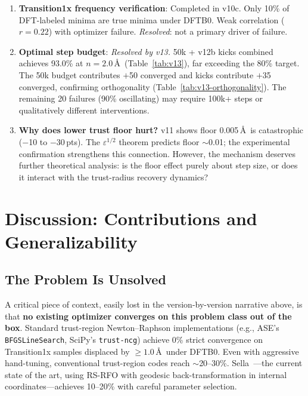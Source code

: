 \documentclass[11pt,a4paper]{article}
\theoremstyle{definition}
\begin{document}
\begin{enumerate}
  \item \textbf{Transition1x frequency verification}: Completed in v10c.
    Only 10\% of DFT-labeled minima are true minima under DFTB0.
    Weak correlation ($r=0.22$) with optimizer failure.
    \emph{Resolved}: not a primary driver of failure.

  \item \textbf{Optimal step budget}: \emph{Resolved by v13.}
    50k + v12b kicks combined achieves 93.0\% at $n=2.0$\,\AA\
    (Table~\ref{tab:v13}), far exceeding the 80\% target.  The
    50k budget contributes $+$50 converged and kicks contribute
    $+$35 converged, confirming orthogonality
    (Table~\ref{tab:v13-orthogonality}).  The remaining 20 failures
    (90\% oscillating) may require 100k+ steps or qualitatively
    different interventions.

  \item \textbf{Why does lower trust floor hurt?}  v11 shows floor
    0.005\,\AA\ is catastrophic ($-$10 to $-$30\,pts).  The
    $\varepsilon^{1/2}$ theorem predicts floor $\sim$0.01; the
    experimental confirmation strengthens this connection.  However, the
    mechanism deserves further theoretical analysis: is the floor effect
    purely about step size, or does it interact with the trust-radius
    recovery dynamics?
\end{enumerate}

\section{Discussion: Contributions and Generalizability}
\label{sec:discussion}

\subsection{The Problem Is Unsolved}
\label{sec:unsolved}

A critical piece of context, easily lost in the version-by-version
narrative above, is that \textbf{no existing optimizer converges on this
problem class out of the box}.  Standard trust-region Newton--Raphson
implementations (e.g., ASE's \texttt{BFGSLineSearch}, SciPy's
\texttt{trust-ncg}) achieve 0\% strict convergence on Transition1x
samples displaced by $\geq 1.0$\,\AA\ under DFTB0.  Even with
aggressive hand-tuning, conventional trust-region codes reach
$\sim$20--30\%.  Sella~\citep{sella}---the current state of the art,
using RS-RFO with geodesic back-transformation in internal
coordinates---achieves 10--20\% with careful parameter selection.
\end{document}
